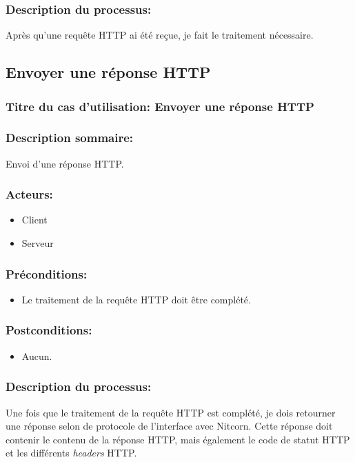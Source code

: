 \documentclass{scrreprt}
\begin{document}
\subsubsection{Description du processus:}
Après qu'une requête HTTP ai été reçue, je fait le traitement nécessaire.

\subsection{Envoyer une réponse HTTP}

\subsubsection{Titre du cas d'utilisation: Envoyer une réponse HTTP}

\subsubsection{Description sommaire:}
Envoi d'une réponse HTTP.

\subsubsection{Acteurs:}
\begin{itemize}
	\item Client
	\item Serveur
\end{itemize}

\subsubsection{Préconditions:}
\begin{itemize}
	\item Le traitement de la requête HTTP doit être complété.
\end{itemize}

\subsubsection{Postconditions:}
\begin{itemize}
	\item Aucun.
\end{itemize}

\subsubsection{Description du processus:}
Une fois que le traitement de la requête HTTP est complété, je dois retourner une 
réponse selon de protocole de l'interface avec Nitcorn. Cette réponse doit
contenir le contenu de la réponse HTTP, mais également le code de statut HTTP
et les différents \textit{headers} HTTP.
\end{document}
